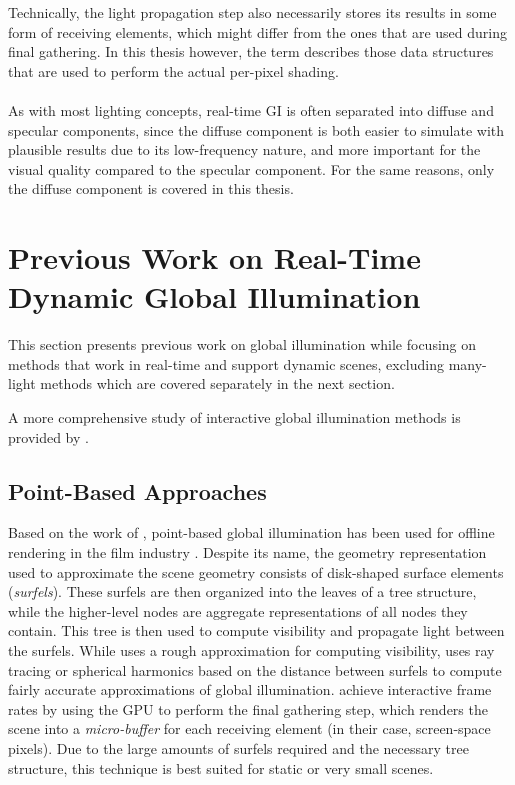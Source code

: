 Technically, the light propagation step also necessarily stores its results in some form of receiving elements, which might differ from the ones that are used during final gathering. In this thesis however, the term describes those data structures that are used to perform the actual per-pixel shading.
\\
\\
As with most lighting concepts, real-time GI is often separated into diffuse and specular components, since the diffuse component is both easier to simulate with plausible results due to its low-frequency nature, and more important for the visual quality compared to the specular component. For the same reasons, only the diffuse component is covered in this thesis.



\section{Previous Work on Real-Time Dynamic Global Illumination}

This section presents previous work on global illumination while focusing on methods that work in real-time and support dynamic scenes, excluding many-light methods which are covered separately in the next section.

A more comprehensive study of interactive global illumination methods is provided by \citet{Ritschel:2012:GISTAR}.

\subsection{Point-Based Approaches}

Based on the work of \citet{Bunnell:2005:AO}, point-based global illumination has been used for offline rendering in the film industry \citep{christensen2008point}.
Despite its name, the geometry representation used to approximate the scene geometry consists of disk-shaped surface elements (\emph{surfels}).
These surfels are then organized into the leaves of a tree structure, while the higher-level nodes are aggregate representations of all nodes they contain.
This tree is then used to compute visibility and propagate light between the surfels.
While \citet{Bunnell:2005:AO} uses a rough approximation for computing visibility, \citet{christensen2008point} uses ray tracing or spherical harmonics based on the distance between surfels to compute fairly accurate approximations of global illumination.
\citet{Ritschel:2009:microrendering} achieve interactive frame rates by using the GPU to perform the final gathering step, which renders the scene into a \emph{micro-buffer} for each receiving element (in their case, screen-space pixels).
Due to the large amounts of surfels required and the necessary tree structure, this technique is best suited for static or very small scenes.



